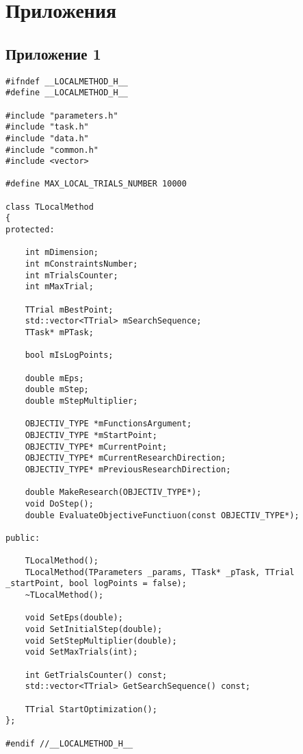 \section{Приложения}
\subsection{Приложение 1}
\label{attach1}

\begin{lstlisting}[frame=single]
#ifndef __LOCALMETHOD_H__
#define __LOCALMETHOD_H__

#include "parameters.h"
#include "task.h"
#include "data.h"
#include "common.h"
#include <vector>

#define MAX_LOCAL_TRIALS_NUMBER 10000

class TLocalMethod
{
protected:

	int mDimension;
	int mConstraintsNumber;
	int mTrialsCounter;
	int mMaxTrial;

	TTrial mBestPoint;
	std::vector<TTrial> mSearchSequence;
	TTask* mPTask;

	bool mIsLogPoints;

	double mEps;
	double mStep;
	double mStepMultiplier;

	OBJECTIV_TYPE *mFunctionsArgument;
	OBJECTIV_TYPE *mStartPoint;
	OBJECTIV_TYPE* mCurrentPoint;
	OBJECTIV_TYPE* mCurrentResearchDirection;
	OBJECTIV_TYPE* mPreviousResearchDirection;

	double MakeResearch(OBJECTIV_TYPE*);
	void DoStep();
	double EvaluateObjectiveFunctiuon(const OBJECTIV_TYPE*);

public:

	TLocalMethod();
	TLocalMethod(TParameters _params, TTask* _pTask, TTrial _startPoint, bool logPoints = false);
	~TLocalMethod();

	void SetEps(double);
	void SetInitialStep(double);
	void SetStepMultiplier(double);
	void SetMaxTrials(int);

	int GetTrialsCounter() const;
	std::vector<TTrial> GetSearchSequence() const;

	TTrial StartOptimization();
};

#endif //__LOCALMETHOD_H__
\end{lstlisting}
